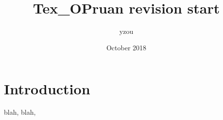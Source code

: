 \documentclass{article}
\title{Tex_OPruan revision start}
\author{yzou }
\date{October 2018}
\begin{document}
\maketitle

\section{Introduction}
blah, blah, 
\end{document}

